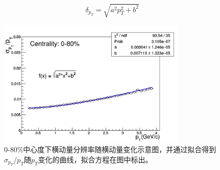 \begin{equation}
    \label{eq:pT_res}
    \delta_{p_T} = \sqrt{a^2 p_T^2 + b^2}
\end{equation}

\begin{figure}[htb]
    \begin{center}
    \includegraphics[width=0.8\textwidth,clip]{figures/Chapter4/pT_res_embd.png}
    \end{center}
    \caption[横动量分辨率随横动量变化示意图]{0-80\%中心度下横动量分辨率随横动量变化示意图，并通过拟合得到$\sigma_{p_T}/p_T$随$p_T$变化的曲线，拟合方程在图中标出。}
    \label{fig:pT_res_embd}
\end{figure}

